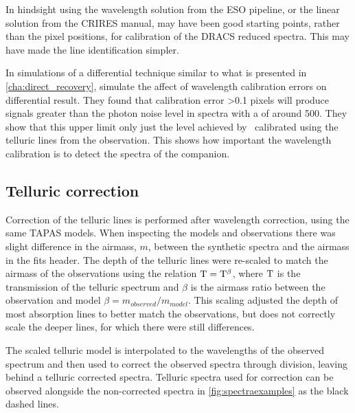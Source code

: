 In hindsight using the wavelength solution from the {ESO} pipeline, or the linear solution from the CRIRES manual, may have been good starting points, rather than the pixel positions, for calibration of the {DRACS} reduced spectra.
This may have made the line identification simpler.

In simulations of a differential technique similar to what is presented in \cref{cha:direct_recovery}, \citet{kostogryz_spectral_2013} simulate the affect of wavelength calibration errors on differential result.
They found that calibration error >0.1 pixels will produce signals greater than the photon noise level in spectra with a \snr{} of around 500.
They show that this upper limit only just the level achieved by~\citep{brogi_signature_2012} calibrated using the telluric lines from the observation.
This shows how important the wavelength calibration is to detect the spectra of the companion.


\subsection{Telluric correction}
\label{subsec:telluric_correction_application}
Correction of the telluric lines is performed after wavelength correction, using the same {TAPAS} models.
When inspecting the models and observations there was slight difference in the airmass, $m$, between the synthetic spectra and the airmass in the fits header.
The depth of the telluric lines were re-scaled to match the airmass of the observations using the relation \(\rm T = T^{\beta}\), where \(\rm T\) is the transmission of the telluric spectrum and \(\beta\) is the airmass ratio between the observation and model $\beta ={m_{observed}/m_{model}}$.
This scaling adjusted the depth of most absorption lines to better match the observations, but does not correctly scale the deeper  lines, for which there were still differences.

The scaled telluric model is interpolated to the wavelengths of the observed spectrum and then used to correct the observed spectra through division, leaving behind a telluric corrected spectra.
Telluric spectra used for correction can be observed alongside the non-corrected spectra in \cref{fig:spectraexamples} as the black dashed lines.

